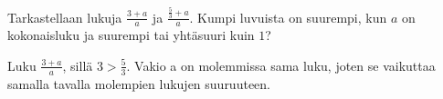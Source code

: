\begin{tehtava}
            \begin{vastaus}
            \end{vastaus}
\end{tehtava}

\begin{tehtava}
            \begin{vastaus}		
            \end{vastaus}
\end{tehtava}
        
\begin{tehtava} 
            \begin{vastaus}		
            \end{vastaus}
\end{tehtava}
        
\begin{tehtava}
	\begin{vastaus}
	\end{vastaus}
\end{tehtava}
    
\begin{tehtava}
 Tarkastellaan lukuja $\frac{3+a}{a}$ ja $\frac{\frac{5}{3}+a}{a}$. Kumpi luvuista on suurempi, kun $a$ on kokonaisluku ja suurempi tai yhtäsuuri kuin $1$?
 \begin{vastaus}
  Luku $\frac{3+a}{a}$, sillä $3>\frac{5}{3}$. Vakio a on molemmissa sama luku, joten se vaikuttaa samalla tavalla molempien lukujen suuruuteen.
 \end{vastaus}
\end{tehtava}

